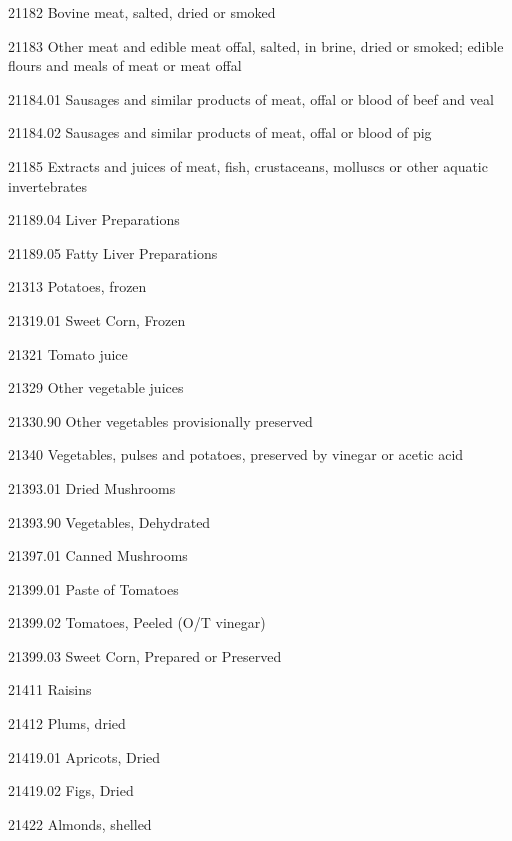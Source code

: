 \documentclass[nojss]{jss}
\begin{document}
\begin{appendices}
\begin{Schunk}
\begin{Soutput}
  21182     Bovine meat, salted, dried or  
                        smoked             

  21183       Other meat and edible meat   
            offal, salted, in brine, dried 
             or smoked; edible flours and  
             meals of meat or meat offal   

 21184.01   Sausages and similar products  
              of meat, offal or blood of   
                    beef and veal          

 21184.02   Sausages and similar products  
            of meat, offal or blood of pig 

  21185      Extracts and juices of meat,  
            fish, crustaceans, molluscs or 
             other aquatic invertebrates   

 21189.04         Liver Preparations       

 21189.05      Fatty Liver Preparations    

  21313            Potatoes, frozen        

 21319.01         Sweet Corn, Frozen       

  21321              Tomato juice          

  21329         Other vegetable juices     

 21330.90   Other vegetables provisionally 
                      preserved            

  21340         Vegetables, pulses and     
            potatoes, preserved by vinegar 
                    or acetic acid         

 21393.01          Dried Mushrooms         

 21393.90       Vegetables, Dehydrated     

 21397.01          Canned Mushrooms        

 21399.01         Paste of Tomatoes        

 21399.02   Tomatoes, Peeled (O/T vinegar) 

 21399.03      Sweet Corn, Prepared or     
                      Preserved            

  21411                Raisins             

  21412              Plums, dried          

 21419.01          Apricots, Dried         

 21419.02            Figs, Dried           

  21422            Almonds, shelled        


\end{Soutput}
\end{Schunk}
\end{appendices}
\end{document}

